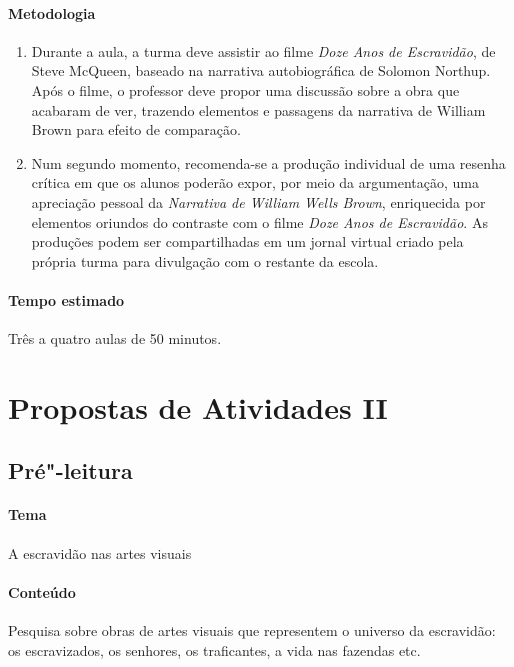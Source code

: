 \documentclass[12pt]{extarticle}
\begin{document}
 \paragraph{Metodologia}
   \begin{enumerate}
    \item 
    Durante a aula, a turma deve assistir ao filme \emph{Doze Anos de Escravidão},
    de Steve McQueen, baseado na narrativa autobiográfica de Solomon Northup. 
    Após o filme, o professor deve propor uma discussão sobre a obra que acabaram de 
    ver, trazendo elementos e passagens da narrativa de William Brown 
    para efeito de comparação.

  \item
   Num segundo momento, recomenda-se a produção individual de uma
resenha crítica em que os
alunos poderão expor, por meio da argumentação, uma apreciação
pessoal da \emph{Narrativa de William Wells Brown}, enriquecida por
elementos oriundos do contraste com o filme \emph{Doze Anos de Escravidão}.
As produções podem ser compartilhadas em um jornal virtual criado 
pela própria turma para divulgação com o restante da escola.
   \end{enumerate}

 \paragraph{Tempo estimado} Três a quatro aulas de 50 minutos.


\section{Propostas de Atividades II}

\subsection{Pré"-leitura}

 \paragraph{Tema} A escravidão nas artes visuais

 \paragraph{Conteúdo} Pesquisa sobre obras de artes visuais que representem 
 o universo da escravidão: os escravizados, os senhores, os traficantes,
 a vida nas fazendas etc.
\end{document}
